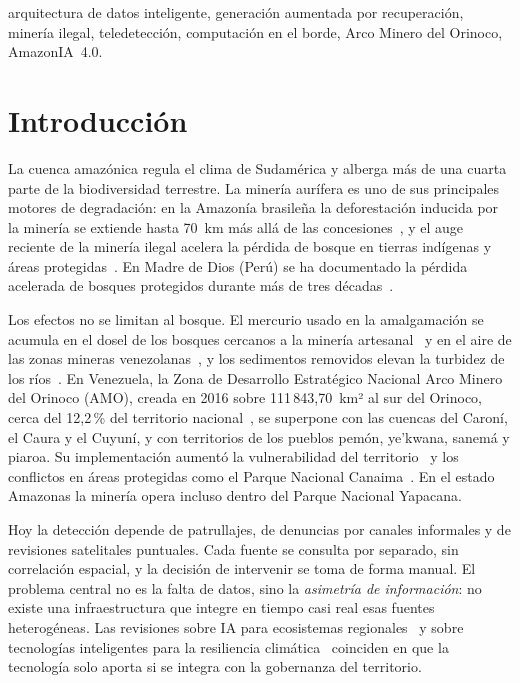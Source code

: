 \documentclass[conference]{IEEEtran}
\begin{document}
\begin{IEEEkeywords}
arquitectura de datos inteligente, generación aumentada por recuperación, minería ilegal, teledetección, computación en el borde, Arco Minero del Orinoco, AmazonIA~4.0.
\end{IEEEkeywords}

\section{Introducción}

La cuenca amazónica regula el clima de Sudamérica y alberga más de una cuarta parte de la biodiversidad terrestre. La minería aurífera es uno de sus principales motores de degradación: en la Amazonía brasileña la deforestación inducida por la minería se extiende hasta 70~km más allá de las concesiones~\cite{sonter2017}, y el auge reciente de la minería ilegal acelera la pérdida de bosque en tierras indígenas y áreas protegidas~\cite{siqueira2021}. En Madre de Dios (Perú) se ha documentado la pérdida acelerada de bosques protegidos durante más de tres décadas~\cite{asner2017,caballero2018}.

Los efectos no se limitan al bosque. El mercurio usado en la amalgamación se acumula en el dosel de los bosques cercanos a la minería artesanal~\cite{gerson2022} y en el aire de las zonas mineras venezolanas~\cite{garcia2006}, y los sedimentos removidos elevan la turbidez de los ríos~\cite{lobo2015}. En Venezuela, la Zona de Desarrollo Estratégico Nacional Arco Minero del Orinoco (AMO), creada en 2016 sobre 111\,843,70~km² al sur del Orinoco, cerca del 12,2\,\% del territorio nacional~\cite{decreto2248}, se superpone con las cuencas del Caroní, el Caura y el Cuyuní, y con territorios de los pueblos pemón, ye'kwana, sanemá y piaroa. Su implementación aumentó la vulnerabilidad del territorio~\cite{colmenares2024} y los conflictos en áreas protegidas como el Parque Nacional Canaima~\cite{rodriguez2023}. En el estado Amazonas la minería opera incluso dentro del Parque Nacional Yapacana.

Hoy la detección depende de patrullajes, de denuncias por canales informales y de revisiones satelitales puntuales. Cada fuente se consulta por separado, sin correlación espacial, y la decisión de intervenir se toma de forma manual. El problema central no es la falta de datos, sino la \emph{asimetría de información}: no existe una infraestructura que integre en tiempo casi real esas fuentes heterogéneas. Las revisiones sobre IA para ecosistemas regionales~\cite{pimenow2025} y sobre tecnologías inteligentes para la resiliencia climática~\cite{debruyn2026} coinciden en que la tecnología solo aporta si se integra con la gobernanza del territorio.
\end{document}
